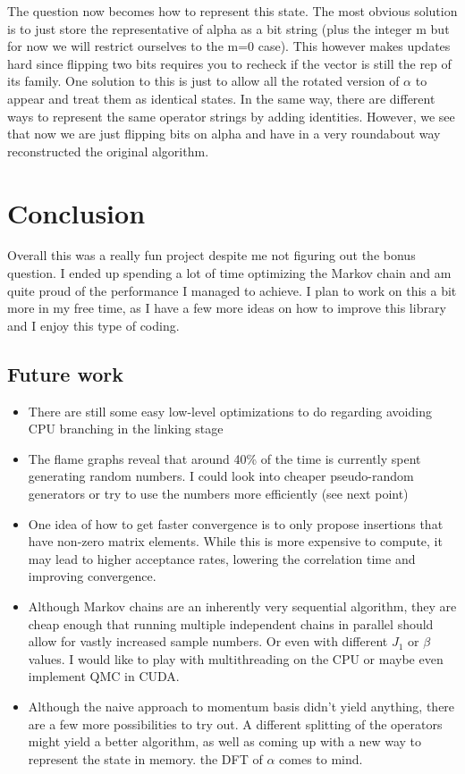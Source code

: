 \documentclass[ngerman]{scrartcl}
\begin{document}
The question now becomes how to represent this state. The most obvious solution is to just store the representative of alpha as a bit string (plus the integer m but for now we will restrict ourselves to the m=0 case). This however makes updates hard since flipping two bits requires you to recheck if the vector is still the rep of its family. One solution to this is just to allow all the rotated version of $\alpha$ to appear and treat them as identical states. In the same way, there are different ways to represent the same operator strings by adding identities. However, we see that now we are just flipping bits on alpha and have in a very roundabout way reconstructed the original algorithm.
\section*{Conclusion}
Overall this was a really fun project despite me not figuring out the bonus question. I ended up spending a lot of time optimizing the Markov chain and am quite proud of the performance I managed to achieve. I plan to work on this a bit more in my free time, as I have a few more ideas on how to improve this library and I enjoy this type of coding.
\subsection*{Future work}
\begin{itemize}
  \item There are still some easy low-level optimizations to do regarding avoiding CPU branching in the linking stage
  \item The flame graphs reveal that around 40\% of the time is currently spent generating random numbers. I could look into cheaper pseudo-random generators or try to use the numbers more efficiently (see next point)
  \item One idea of how to get faster convergence is to only propose insertions that have non-zero matrix elements. While this is more expensive to compute, it may lead to higher acceptance rates, lowering the correlation time and improving convergence.
  \item Although Markov chains are an inherently very sequential algorithm, they are cheap enough that running multiple independent chains in parallel should allow for vastly increased sample numbers. Or even with different $J_1$ or $\beta$ values. I would like to play with multithreading on the CPU or maybe even implement QMC in CUDA.
  \item Although the naive approach to momentum basis didn't yield anything, there are a few more possibilities to try out. A different splitting of the operators might yield a better algorithm, as well as coming up with a new way to represent the state in memory. the DFT of $\alpha$ comes to mind.
\end{itemize}
\end{document}
